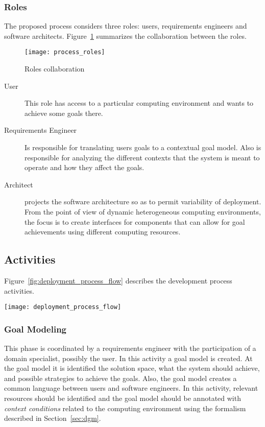 \subsubsection{Roles}
The proposed process considers three roles: users, requirements engineers and software architects.
Figure~\ref{fig:process_roles} summarizes the collaboration between the roles.

 \begin{figure}[!htb]
   \centering
   \texttt{[image: process\_roles]}
   \caption{Roles collaboration}
 \label{fig:process_roles}
 \end{figure}

\begin{description}
  \item[User]
  This role has access to a particular computing environment and wants to achieve some goals there.
  \item[Requirements Engineer]
  Is responsible for translating users goals to a contextual goal model. Also is responsible for analyzing the different contexts that the system is meant to operate and how they affect the goals.
  \item[Architect] projects the software architecture so as to permit variability of deployment.
  From the point of view of dynamic heterogeneous computing environments, the focus is to create interfaces for components that can allow for goal achievements using different computing resources.

\end{description}



\subsection{Activities}

Figure~\ref{fig:deployment_process_flow} describes the development process activities.

\label{sub:Proposal}
\begin{figure*}[!htb]
  \centering
  \texttt{[image: deployment\_process\_flow]}
  \caption{Deployment Process Activities}
\label{fig:deployment_process_flow}
\end{figure*}

\subsubsection{Goal Modeling}
This phase is coordinated by a requirements engineer with the participation of a domain specialist, possibly the user.
In this activity a goal model is created. At the goal model it is identified the solution space, what the system should achieve, and possible strategies to achieve the goals. Also, the goal model creates a common language between users and software engineers.
In this activity, relevant resources should be identified and the goal model should be annotated with \emph{context conditions} related to the computing environment using the formalism described in Section~\ref{sec:dgm}.


